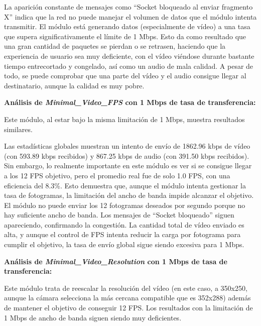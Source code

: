La aparición constante de mensajes como ``Socket bloqueado al enviar fragmento X'' indica que la red no puede manejar el volumen de datos que el módulo intenta transmitir. El módulo está generando datos (especialmente de vídeo) a una tasa que supera significativamente el límite de 1 Mbps. Esto da como resultado que una gran cantidad de paquetes se pierdan o se retrasen, haciendo que la experiencia de usuario sea muy deficiente, con el vídeo viéndose durante bastante tiempo entrecortado y congelado, así como un audio de mala calidad. A pesar de todo, se puede comprobar que una parte del vídeo y el audio consigue llegar al destinatario, aunque la calidad es muy pobre.

\vspace{\baselineskip}

\textbf{Análisis de \textit{Minimal\_Video\_FPS} con 1 Mbps de tasa de transferencia:}
\vspace{\baselineskip}

Este módulo, al estar bajo la misma limitación de 1 Mbps, muestra resultados similares.
\vspace{\baselineskip}

Las estadísticas globales muestran un intento de envío de 1862.96 kbps de vídeo (con 593.89 kbps recibidos) y 867.25 kbps de audio (con 391.50 kbps recibidos). Sin embargo, lo realmente importante en este módulo es ver si se consigue llegar a los 12 FPS objetivo, pero el promedio real fue de solo 1.0 FPS, con una eficiencia del 8.3\%. Esto demuestra que, aunque el módulo intenta gestionar la tasa de fotogramas, la limitación del ancho de banda impide alcanzar el objetivo. El módulo no puede enviar los 12 fotogramas deseados por segundo porque no hay suficiente ancho de banda. Los mensajes de ``Socket bloqueado'' siguen apareciendo, confirmando la congestión. La cantidad total de vídeo enviado es alta, y aunque el control de FPS intenta reducir la carga por fotograma para cumplir el objetivo, la tasa de envío global sigue siendo excesiva para 1 Mbps.

\vspace{\baselineskip}

\textbf{Análisis de \textit{Minimal\_Video\_Resolution} con 1 Mbps de tasa de transferencia:}
\vspace{\baselineskip}

Este módulo trata de reescalar la resolución del vídeo (en este caso, a 350x250, aunque la cámara selecciona la más cercana compatible que es 352x288) además de mantener el objetivo de conseguir 12 FPS. Los resultados con la limitación de 1 Mbps de ancho de banda siguen siendo muy deficientes.
\vspace{\baselineskip}

